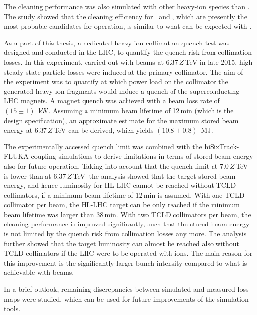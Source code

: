 The cleaning performance was also simulated with other heavy-ion species than \lead. The study showed that the cleaning efficiency for \, and , which are presently the most probable candidates for operation, is similar to what can be expected with \lead.
\vspace{0.2cm} 

\thispagestyle{plain}


As a part of this thesis, a dedicated heavy-ion collimation quench test was designed and conducted in the LHC, to quantify the quench risk from collimation losses. In this experiment, carried out with \lead beams at 6.37$\,Z\,$TeV in late 2015, high steady state particle losses were induced at the primary collimator. The aim of the experiment was to quantify at which power load on the collimator the generated heavy-ion fragments would induce a quench of the superconducting LHC magnets. A magnet quench was achieved with a beam loss rate of $(15 \pm 1)$~kW. Assuming a minimum beam lifetime of 12\,min (which is the design specification), an approximate estimate for the maximum stored beam energy at 6.37$\,Z\,$TeV can be derived, which yields $(10.8 \pm 0.8)$~MJ. 
\vspace{0.2cm} 

The experimentally accessed quench limit was combined with the hiSixTrack-FLUKA coupling simulations to derive limitations in terms of stored beam energy also for future operation. Taking into account that the quench limit at $7.0\,Z\,$TeV is lower than at $6.37\,Z\,$TeV, the analysis showed that the target stored beam energy, and hence luminosity for HL-LHC cannot be reached without TCLD collimators, if a minimum beam lifetime of 12\,min is assumed. With one TCLD collimator per beam, the HL-LHC target can be only reached if the minimum beam lifetime was larger than 38$\,$min. With two TCLD collimators per beam, the cleaning performance is improved significantly, such that the stored beam energy is not limited by the quench risk from collimation losses any more. The analysis further showed that the target luminosity can almost be reached also without TCLD collimators if the LHC were to be operated with   ions. The main reason for this improvement is the significantly larger bunch intensity compared to what is achievable with \lead beams.
\vspace{0.2cm} 

In a brief outlook, remaining discrepancies between simulated and measured loss maps were studied, which can be used for future improvements of the simulation tools. 



